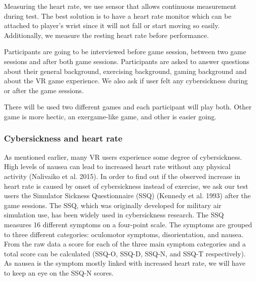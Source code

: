 \documentclass{sig-alternate-05-2015}
\begin{document}
Measuring the heart rate, we use sensor that allows continuous measurement 
during test. The best solution is to have a heart rate monitor which can 
be attached to player’s wrist since it will not fall or start moving so 
easily. Additionally, we measure the resting heart rate before performance.

Participants are going to be interviewed before game session, between two 
game sessions and after both game sessions. Participants are asked to 
answer questions about their general background, exercising background, 
gaming background and about the VR game experience. We also ask if user 
felt any cybersickness during or after the game sessions. 

There will be used two different games and each participant will play both. 
Other game is more hectic, an exergame-like game, and other is easier going.

\subsubsection{Cybersickness and heart rate}
As mentioned earlier, many VR users experience some degree of cybersickness. 
High levels of nausea can lead to increased heart rate without any physical 
activity (Nalivaiko et al. 2015). In order to find out if the observed increase 
in heart rate is caused by onset of cybersickness instead of exercise, we ask 
our test users the Simulator Sickness Questionnaire (SSQ) (Kennedy et al. 1993) 
after the game sessions. The SSQ, which was originally developed for military air 
simulation use, has been widely used in cybersickness research. The SSQ measures 
16 different symptoms on a four-point scale. The symptoms are grouped to three 
different categories: oculomotor symptoms, disorientation, and nausea. From 
the raw data a score for each of the three main symptom categories and a total 
score can be calculated (SSQ-O, SSQ-D, SSQ-N, and SSQ-T respectively). As nausea 
is the symptom mostly linked with increased heart rate, we will have to keep an 
eye on the SSQ-N scores.
\end{document}

